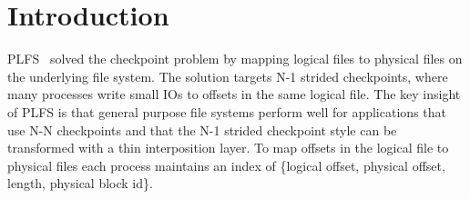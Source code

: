 \section{Introduction}
\label{sec:introduction}

PLFS~\cite{bent_plfs_2009} solved the checkpoint problem by mapping logical
files to physical files on the underlying file system. The solution targets N-1
strided checkpoints, where many processes write small IOs to offsets in the
same logical file. The key insight of PLFS is that general purpose file systems
perform well for applications that use N-N checkpoints and that the N-1 strided
checkpoint style can be transformed with a thin interposition layer. To map
offsets in the logical file to physical files each process maintains an index
of \{logical offset, physical offset, length, physical block id\}. 

